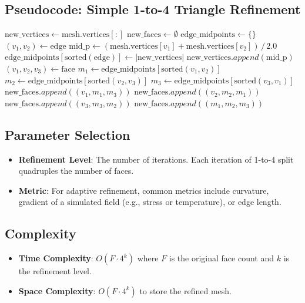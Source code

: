 \subsection{Pseudocode: Simple 1-to-4 Triangle Refinement}
\begin{algorithm}
\caption{Refine Mesh}
\label{alg:refine_mesh}
\begin{algorithmic}[1]
    \State $\text{new\_vertices} \gets \text{mesh.vertices}[:]$
    \State $\text{new\_faces} \gets \emptyset$
    \State $\text{edge\_midpoints} \gets \{\}$
        \State $(v_1, v_2) \gets \text{edge}$
        \State $\text{mid\_p} \gets (\text{mesh.vertices}[v_1] + \text{mesh.vertices}[v_2]) \,/\, 2.0$
        \State $\text{edge\_midpoints}[\text{sorted}(\text{edge})] \gets |\text{new\_vertices}|$
        \State $\text{new\_vertices}.append(\text{mid\_p})$
    \EndFor
        \State $(v_1, v_2, v_3) \gets \text{face}$
        \State $m_1 \gets \text{edge\_midpoints}[\text{sorted}(v_1, v_2)]$
        \State $m_2 \gets \text{edge\_midpoints}[\text{sorted}(v_2, v_3)]$
        \State $m_3 \gets \text{edge\_midpoints}[\text{sorted}(v_3, v_1)]$
        \State $\text{new\_faces}.append((v_1, m_1, m_3))$
        \State $\text{new\_faces}.append((v_2, m_2, m_1))$
        \State $\text{new\_faces}.append((v_3, m_3, m_2))$
        \State $\text{new\_faces}.append((m_1, m_2, m_3))$
    \EndFor
    \State \Return {}
\EndFunction
\end{algorithmic}
\end{algorithm}

\subsection{Parameter Selection}
\begin{itemize}
\item \textbf{Refinement Level}: The number of iterations. Each iteration of 1-to-4 split quadruples the number of faces.
\item \textbf{Metric}: For adaptive refinement, common metrics include curvature, gradient of a simulated field (e.g., stress or temperature), or edge length.
\end{itemize}

\subsection{Complexity}
\begin{itemize}
\item \textbf{Time Complexity}: $O(F \cdot 4^k)$ where $F$ is the original face count and $k$ is the refinement level.
\item \textbf{Space Complexity}: $O(F \cdot 4^k)$ to store the refined mesh.
\end{itemize}

